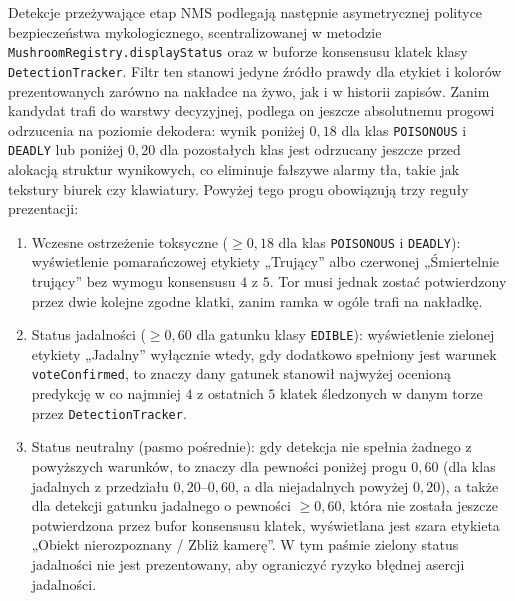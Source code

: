 Detekcje przeżywające etap NMS podlegają następnie asymetrycznej polityce bezpieczeństwa mykologicznego, scentralizowanej w metodzie \texttt{MushroomRegistry.displayStatus} oraz w buforze konsensusu klatek klasy \texttt{DetectionTracker}. Filtr ten stanowi jedyne źródło prawdy dla etykiet i kolorów prezentowanych zarówno na nakładce na żywo, jak i w historii zapisów. Zanim kandydat trafi do warstwy decyzyjnej, podlega on jeszcze absolutnemu progowi odrzucenia na poziomie dekodera: wynik poniżej $0{,}18$ dla klas \texttt{POISONOUS} i \texttt{DEADLY} lub poniżej $0{,}20$ dla pozostałych klas jest odrzucany jeszcze przed alokacją struktur wynikowych, co eliminuje fałszywe alarmy tła, takie jak tekstury biurek czy klawiatury. Powyżej tego progu obowiązują trzy reguły prezentacji:
\begin{enumerate}
 \item Wczesne ostrzeżenie toksyczne ($\ge 0{,}18$ dla klas \texttt{POISONOUS} i \texttt{DEADLY}): wyświetlenie pomarańczowej etykiety „Trujący” albo czerwonej „Śmiertelnie trujący” bez wymogu konsensusu $4$ z $5$. Tor musi jednak zostać potwierdzony przez dwie kolejne zgodne klatki, zanim ramka w ogóle trafi na nakładkę.
 \item Status jadalności ($\ge 0{,}60$ dla gatunku klasy \texttt{EDIBLE}): wyświetlenie zielonej etykiety „Jadalny” wyłącznie wtedy, gdy dodatkowo spełniony jest warunek \texttt{voteConfirmed}, to znaczy dany gatunek stanowił najwyżej ocenioną predykcję w co najmniej $4$ z ostatnich $5$ klatek śledzonych w danym torze przez \texttt{DetectionTracker}.
 \item Status neutralny (pasmo pośrednie): gdy detekcja nie spełnia żadnego z powyższych warunków, to znaczy dla pewności poniżej progu $0{,}60$ (dla klas jadalnych z przedziału $0{,}20$--$0{,}60$, a dla niejadalnych powyżej $0{,}20$), a także dla detekcji gatunku jadalnego o pewności $\ge 0{,}60$, która nie została jeszcze potwierdzona przez bufor konsensusu klatek, wyświetlana jest szara etykieta „Obiekt nierozpoznany / Zbliż kamerę”. W tym paśmie zielony status jadalności nie jest prezentowany, aby ograniczyć ryzyko błędnej asercji jadalności.
\end{enumerate}
